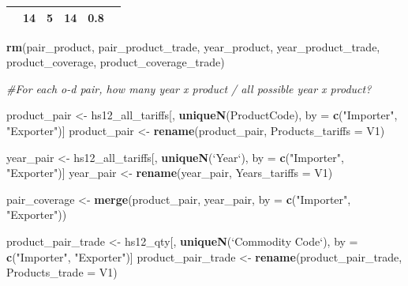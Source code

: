 \documentclass[10pt,]{article}
\newenvironment{Shaded}{\begin{snugshade}}{\end{snugshade}}
\newcommand{\KeywordTok}[1]{\textcolor[rgb]{0.13,0.29,0.53}{\textbf{{#1}}}}
\newcommand{\DataTypeTok}[1]{\textcolor[rgb]{0.13,0.29,0.53}{{#1}}}
\newcommand{\StringTok}[1]{\textcolor[rgb]{0.31,0.60,0.02}{{#1}}}
\newcommand{\CommentTok}[1]{\textcolor[rgb]{0.56,0.35,0.01}{\textit{{#1}}}}
\newcommand{\NormalTok}[1]{{#1}}
\begin{document}
\begin{longtable}[]{@{}cccccc@{}}
\begin{minipage}[t]{0.16\columnwidth}
\end{minipage} & \begin{minipage}[t]{0.16\columnwidth}\centering\strut
14\strut
\end{minipage} & \begin{minipage}[t]{0.14\columnwidth}\centering\strut
5\strut
\end{minipage} & \begin{minipage}[t]{0.14\columnwidth}\centering\strut
14\strut
\end{minipage} & \begin{minipage}[t]{0.10\columnwidth}\centering\strut
0.8\strut
\end{minipage}\tabularnewline
\bottomrule
\end{longtable}

\begin{Shaded}
\begin{Highlighting}[]
\KeywordTok{rm}\NormalTok{(pair_product, pair_product_trade, year_product, }
   \NormalTok{year_product_trade, product_coverage, product_coverage_trade)}

\CommentTok{#For each o-d pair, how many year x product / all possible year x product?}

\NormalTok{product_pair <-}\StringTok{ }\NormalTok{hs12_all_tariffs[, }\KeywordTok{uniqueN}\NormalTok{(ProductCode), by =}\StringTok{ }\KeywordTok{c}\NormalTok{(}\StringTok{"Importer"}\NormalTok{, }\StringTok{"Exporter"}\NormalTok{)]}
\NormalTok{product_pair <-}\StringTok{ }\KeywordTok{rename}\NormalTok{(product_pair, }\DataTypeTok{Products_tariffs =} \NormalTok{V1)}

\NormalTok{year_pair <-}\StringTok{ }\NormalTok{hs12_all_tariffs[, }\KeywordTok{uniqueN}\NormalTok{(}\StringTok{`}\DataTypeTok{Year}\StringTok{`}\NormalTok{), by =}\StringTok{ }\KeywordTok{c}\NormalTok{(}\StringTok{"Importer"}\NormalTok{, }\StringTok{"Exporter"}\NormalTok{)]}
\NormalTok{year_pair <-}\StringTok{ }\KeywordTok{rename}\NormalTok{(year_pair, }\DataTypeTok{Years_tariffs =} \NormalTok{V1)}

\NormalTok{pair_coverage <-}\StringTok{ }\KeywordTok{merge}\NormalTok{(product_pair, year_pair, }\DataTypeTok{by =} \KeywordTok{c}\NormalTok{(}\StringTok{"Importer"}\NormalTok{, }\StringTok{"Exporter"}\NormalTok{))}

\NormalTok{product_pair_trade <-}\StringTok{ }\NormalTok{hs12_qty[, }\KeywordTok{uniqueN}\NormalTok{(}\StringTok{`}\DataTypeTok{Commodity Code}\StringTok{`}\NormalTok{), by =}\StringTok{ }\KeywordTok{c}\NormalTok{(}\StringTok{"Importer"}\NormalTok{, }\StringTok{"Exporter"}\NormalTok{)]}
\NormalTok{product_pair_trade <-}\StringTok{ }\KeywordTok{rename}\NormalTok{(product_pair_trade, }\DataTypeTok{Products_trade =} \NormalTok{V1)}


\end{Highlighting}
\end{Shaded}
\end{document}
